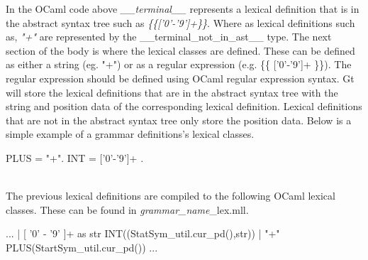 In the OCaml code above \textit{\_\_terminal\_\_} represents a lexical definition that is in the abstract
syntax tree such as \textit{\{\{['0'-'9']+\}\}}. Where as lexical definitions such as, \textit{"+"} are represented by the 
\_\_terminal\_not\_in\_ast\_\_ type. The next section of the body is where the lexical classes are defined. These can
be defined as either a string (eg. "+") or as a regular expression (e.g. \{\{ ['0'-'9']+ \}\}).
The regular expression should be defined using OCaml regular expression syntax.
Gt will store the lexical definitions that are in the abstract syntax tree with the string and position data of the corresponding 
lexical definition. Lexical definitions that are not in the abstract syntax tree only store the position data. Below is a simple 
example of a grammar definitions's lexical classes.\\ 

\begin{gt} 
PLUS = "+".
INT = {{ ['0'-'9']+ }} .
\end{gt} \ \\
\noindent The previous lexical definitions are compiled to the following OCaml 
lexical classes. These can be found in \textit{grammar\_name}\_lex.mll.\\

\begin{gt} 
...
| [ '0' - '9' ]+ as str { INT((StatSym_util.cur_pd(),str)) }
| "+" PLUS(StartSym_util.cur_pd())
...
\end{gt} 

